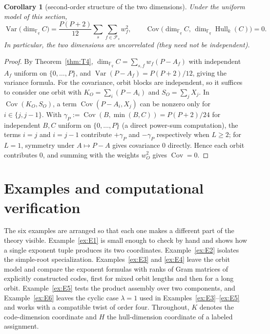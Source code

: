 \documentclass[10pt,journal,draftclsnofoot,onecolumn]{IEEEtran}
\newtheorem{corollary}[theorem]{Corollary}
\theoremstyle{definition}
\theoremstyle{remark}
\newcommand{\Fq}{\mathbb{F}_q}
\newcommand{\Hull}{\operatorname{Hull}}
\begin{document}
\begin{corollary}[second-order structure of the two dimensions]\label{cor:secondorder}
Under the uniform model of this section,
\[
\operatorname{Var}\big(\dim_{\Fq} C\big)
= \frac{P(P+2)}{12}\sum_s\sum_{f\in\mathcal{F}_s} w_f^2,
\qquad
\operatorname{Cov}\big(\dim_{\Fq} C,\,\dim_{\Fq}\Hull_k(C)\big)=0.
\]
In particular, the two dimensions are uncorrelated (they need not be
independent).
\end{corollary}

\begin{proof}
By Theorem~\ref{thm:T4},
\(\dim_{\Fq} C=\sum_{s,f} w_f(P-A_f)\) with independent \(A_f\) uniform
on \(\{0,\dots,P\}\), and
\(\operatorname{Var}(P-A_f)=P(P+2)/12\), giving the variance formula.
For the covariance, orbit blocks are independent, so it suffices to
consider one orbit with \(K_O=\sum_i(P-A_i)\) and \(S_O=\sum_j X_j\).
In \(\operatorname{Cov}(K_O,S_O)\), a term
\(\operatorname{Cov}(P-A_i,X_j)\) can be nonzero only for
\(i\in\{j,j-1\}\). With
\(\gamma_P:=\operatorname{Cov}(B,\min(B,C))=P(P+2)/24\) for independent
\(B,C\) uniform on \(\{0,\dots,P\}\) (a direct power-sum computation),
the terms \(i=j\) and \(i=j-1\) contribute \(+\gamma_P\) and
\(-\gamma_P\) respectively when \(L\ge2\); for \(L=1\), symmetry under
\(A\mapsto P-A\) gives covariance \(0\) directly. Hence each orbit
contributes \(0\), and summing with the weights \(w_O^2\) gives
\(\operatorname{Cov}=0\).
\end{proof}

\section{Examples and computational verification}\label{sec:examples}

The six examples are arranged so that each one makes a different part
of the theory visible. Example~\ref{ex:E1} is small enough to check by
hand and shows how a single exponent tuple produces its two coordinates.
Example~\ref{ex:E2} isolates the simple-root specialization.
Examples~\ref{ex:E3} and \ref{ex:E4} leave the orbit model and compare
the exponent formulas with ranks of Gram matrices of explicitly
constructed codes, first for mixed orbit lengths and then for a long
orbit. Example~\ref{ex:E5} tests the product assembly over two
components, and Example~\ref{ex:E6} leaves the cyclic case \(\lambda = 1\)
used in Examples~\ref{ex:E3}--\ref{ex:E5} and works with a compatible
twist of order four. Throughout, \(K\) denotes the code-dimension coordinate and
\(H\) the hull-dimension coordinate of a labeled assignment.
\end{document}

